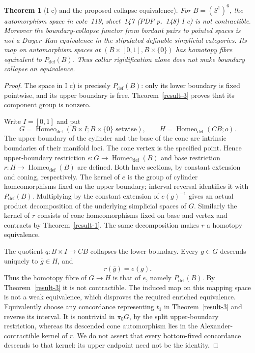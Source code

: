 \documentclass[11pt,a4paper]{article}
\newtheorem{theorem}{Theorem}[section]
\theoremstyle{definition}
\DeclareMathOperator{\Homeo}{Homeo}
\begin{document}
\begin{theorem}[I c) and the proposed collapse equivalence]\label{result-5}
For $B=(S^1)^6$, the automorphism space in cote~119, sheet~147 (PDF p.~148) I c) is not
contractible. Moreover the boundary-collapse functor from bordant pairs
to pointed spaces is not a Dwyer--Kan equivalence in the stipulated
definable simplicial categories. Its map on automorphism spaces at
$(B\times[0,1],B\times\{0\})$ has homotopy fibre equivalent to
$P_{\mathrm{def}}(B)$. Thus collar rigidification alone does not make boundary collapse an equivalence.
\end{theorem}
\begin{proof}
The space in I c) is precisely $P_{\mathrm{def}}(B)$: only its lower
boundary is fixed pointwise, and its upper boundary is free.
Theorem~\ref{result-3} proves that its component group is nonzero.

Write $I=[0,1]$ and put
\[
 G=\Homeo_{\mathrm{def}}(B\times I;B\times\{0\}\text{ setwise}),
 \qquad H=\Homeo_{\mathrm{def}}(CB;o).
\]
The upper boundary of the cylinder and the base of the cone are
intrinsic boundaries of their manifold loci. The cone vertex is the
specified point. Hence upper-boundary restriction
$e:G\to\Homeo_{\mathrm{def}}(B)$ and base restriction
$r:H\to\Homeo_{\mathrm{def}}(B)$ are defined. Both have sections,
by constant extension and coning, respectively.
The kernel of $e$ is the group of cylinder homeomorphisms fixed on the
upper boundary; interval reversal identifies it with $P_{\mathrm{def}}(B)$.
Multiplying by the constant extension of $e(g)^{-1}$ gives an actual
product decomposition of the underlying simplicial spaces of $G$.
Similarly the kernel of $r$ consists of cone homeomorphisms fixed on
base and vertex and contracts by Theorem~\ref{result-1}. The same decomposition makes
$r$ a homotopy equivalence.

The quotient $q:B\times I\to CB$ collapses the lower boundary.
Every $g\in G$ descends uniquely to $\bar g\in H$, and
\[
 r(\bar g)=e(g).
\]
Thus the homotopy fibre of $G\to H$ is that of $e$, namely
$P_{\mathrm{def}}(B)$. By Theorem~\ref{result-3} it is not contractible. The induced
map on this mapping space is not a weak equivalence, which disproves
the required enriched equivalence.
Equivalently choose any concordance representing $t_1$ in Theorem~\ref{result-3} and
reverse its interval. It is nontrivial in $\pi_0G$, by the split
upper-boundary restriction, whereas its descended cone automorphism
lies in the Alexander-contractible kernel of $r$.
We do not assert that every bottom-fixed concordance descends to that
kernel: its upper endpoint need not be the identity.
\end{proof}
\end{document}
